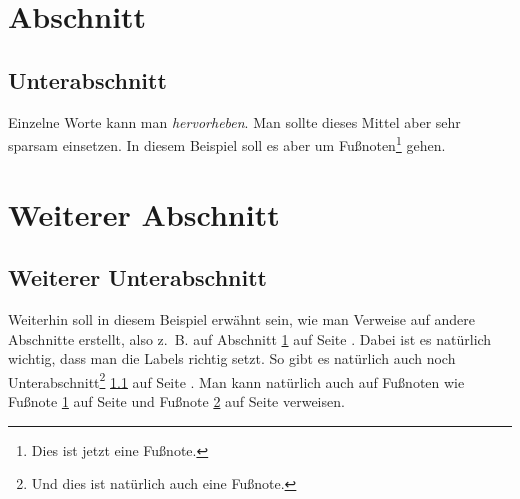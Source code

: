 \documentclass[a4paper, 11pt]{article}
\begin{document}
\maketitle
\section{Abschnitt}
\label{sec:abschnitt}

\subsection{Unterabschnitt}
\label{subsec:unterabschnitt}

Einzelne Worte kann man \emph{hervorheben}. Man sollte dieses Mittel aber sehr
sparsam einsetzen. In diesem Beispiel soll es aber um
Fußnoten\footnote{\label{foot:1}Dies ist jetzt eine Fußnote.} gehen.

\newpage

\section{Weiterer Abschnitt}

\subsection{Weiterer Unterabschnitt}

Weiterhin soll in diesem Beispiel erwähnt sein, wie man Verweise auf andere
Abschnitte erstellt, also z.~B. auf Abschnitt \ref{sec:abschnitt} auf Seite
\pageref{sec:abschnitt}. Dabei ist es natürlich wichtig, dass man die Labels
richtig setzt. So gibt es natürlich auch noch
Unterabschnitt\footnote{\label{foot:2}Und dies ist natürlich auch eine Fußnote.}
\ref{subsec:unterabschnitt} auf Seite \pageref{subsec:unterabschnitt}. Man kann
natürlich auch auf Fußnoten wie Fußnote \ref{foot:1} auf Seite \pageref{foot:1}
und Fußnote \ref{foot:2} auf Seite \pageref{foot:2} verweisen.

\end{document}
